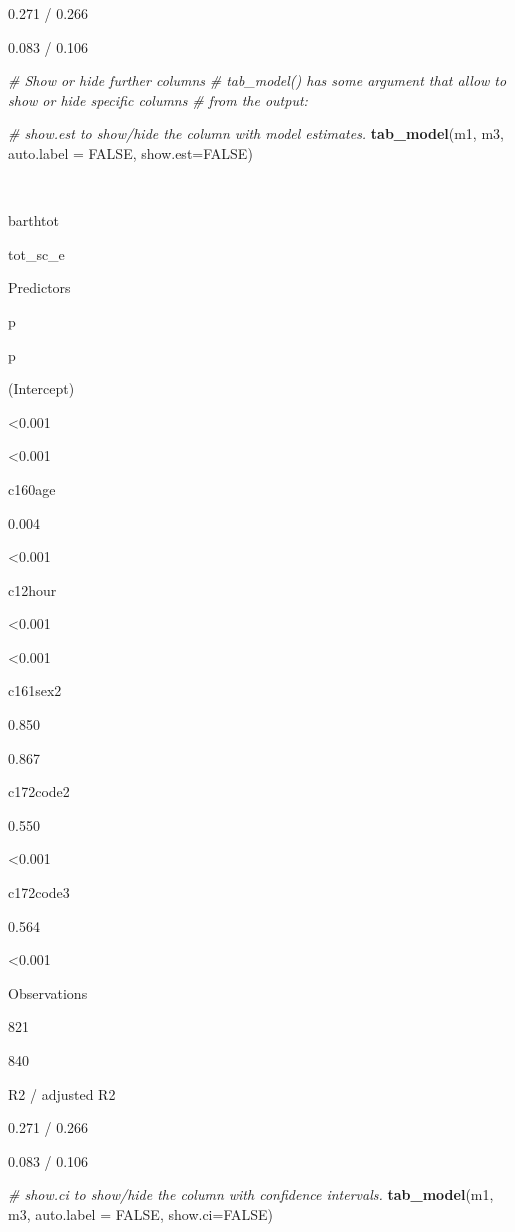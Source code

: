 \documentclass[]{article}
\newenvironment{Shaded}{\begin{snugshade}}{\end{snugshade}}
\newcommand{\KeywordTok}[1]{\textcolor[rgb]{0.13,0.29,0.53}{\textbf{#1}}}
\newcommand{\DataTypeTok}[1]{\textcolor[rgb]{0.13,0.29,0.53}{#1}}
\newcommand{\CommentTok}[1]{\textcolor[rgb]{0.56,0.35,0.01}{\textit{#1}}}
\newcommand{\OtherTok}[1]{\textcolor[rgb]{0.56,0.35,0.01}{#1}}
\newcommand{\NormalTok}[1]{#1}
\begin{document}
0.271 / 0.266

0.083 / 0.106

\begin{Shaded}
\begin{Highlighting}[]
\CommentTok{# Show or hide further columns}
\CommentTok{# tab_model() has some argument that allow to show or hide specific columns }
\CommentTok{# from the output:}

\CommentTok{# show.est to show/hide the column with model estimates.}
\KeywordTok{tab_model}\NormalTok{(m1, m3, }\DataTypeTok{auto.label =} \OtherTok{FALSE}\NormalTok{,  }\DataTypeTok{show.est=}\OtherTok{FALSE}\NormalTok{)}
\end{Highlighting}
\end{Shaded}

~

barthtot

tot\_sc\_e

Predictors

p

p

(Intercept)

\textless{}0.001

\textless{}0.001

c160age

0.004

\textless{}0.001

c12hour

\textless{}0.001

\textless{}0.001

c161sex2

0.850

0.867

c172code2

0.550

\textless{}0.001

c172code3

0.564

\textless{}0.001

Observations

821

840

R2 / adjusted R2

0.271 / 0.266

0.083 / 0.106

\begin{Shaded}
\begin{Highlighting}[]
\CommentTok{# show.ci to show/hide the column with confidence intervals.}
\KeywordTok{tab_model}\NormalTok{(m1, m3, }\DataTypeTok{auto.label =} \OtherTok{FALSE}\NormalTok{, }\DataTypeTok{show.ci=}\OtherTok{FALSE}\NormalTok{)}
\end{Highlighting}
\end{Shaded}
\end{document}
